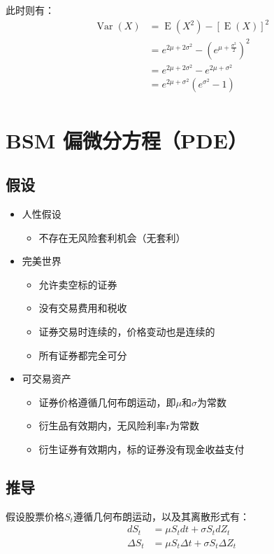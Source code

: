 \documentclass[11pt]{article}
\newcommand{\E}{\operatorname{E}}
\newcommand{\Var}{\operatorname{Var}}
\begin{document}
此时则有：
\begin{align*}
    \Var(X) &= \E(X^2) - [\E(X)]^2  \\
    &= e^{2\mu+2\sigma^2} - (e^{\mu+\frac{\sigma^2}{2}})^2 \\
    &= e^{2\mu+2\sigma^2} - e^{2\mu+\sigma^2} \\
    &= e^{2\mu+\sigma^2}\left(e^{\sigma^2} - 1\right)\\
\end{align*}

\section{BSM 偏微分方程（PDE）}

\subsection{假设}
\begin{itemize}
    \setlength{\itemsep}{0em}
    \item 人性假设
    \begin{itemize}
        \item 不存在无风险套利机会（无套利）
    \end{itemize}
    \item 完美世界
    \begin{itemize}
        \item 允许卖空标的证券
        \item 没有交易费用和税收
        \item 证券交易时连续的，价格变动也是连续的
        \item 所有证券都完全可分
    \end{itemize}
    \item 可交易资产
        \begin{itemize}
            \item 证券价格遵循几何布朗运动，即$\mu$和$\sigma$为常数
            \item 衍生品有效期内，无风险利率r为常数
            \item 衍生证券有效期内，标的证券没有现金收益支付
        \end{itemize}
\end{itemize}

\subsection{推导}

假设股票价格$S_t$遵循几何布朗运动，以及其离散形式有：
\begin{align*}
    d S_t & = \mu S_t dt + \sigma S_t d Z_t \\
    \Delta S_t & = \mu S_t \Delta t + \sigma S_t \Delta Z_t
\end{align*}
\end{document}
